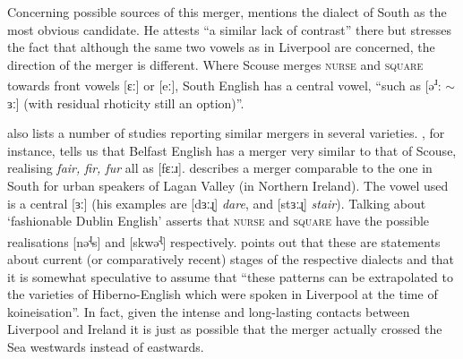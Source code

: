 Concerning possible sources of this merger, \citet[128]{honeybone2007} mentions the dialect of South  as the most obvious candidate.
He attests ``a similar lack of contrast'' there but stresses the fact that although the same two vowels as in Liverpool are concerned, the direction of the merger is different.
Where Scouse merges \textsc{nurse} and \textsc{square} towards front vowels [ɛː] or [eː], South  English has a central vowel, ``such as [ə\textsuperscript{ɹ}: \(\sim\) ɜː] (with residual rhoticity still an option)''.

\textcite{honeybone2007} also lists a number of studies reporting similar mergers in several  varieties.
\citet{wells1982}, for instance, tells us that Belfast English has a merger very similar to that of Scouse, realising \emph{fair, fir, fur} all as [fɛːɹ].
\citet[cf.][48]{harris1985} describes a merger comparable to the one in South  for urban speakers of Lagan Valley (in Northern Ireland).
The vowel used is a central [ɜː] (his examples are [dɜːɻ] \emph{dare}, and [stɜːɻ] \emph{stair}).
Talking about `fashionable Dublin English' \citet{hickey1999} asserts that \textsc{nurse} and \textsc{square} have the possible realisations [nə\textsuperscript{ɻ}s] and [skwə\textsuperscript{ɻ}] respectively.
\textcite[128]{honeybone2007} points out that these are statements about current (or comparatively recent) stages of the respective dialects and that it is somewhat speculative to assume that ``these patterns can be extrapolated to the varieties of Hiberno-English which were spoken in Liverpool at the time of koineisation''.
In fact, given the intense and long-lasting contacts between Liverpool and Ireland it is just as possible that the merger actually crossed the  Sea westwards instead of eastwards.

